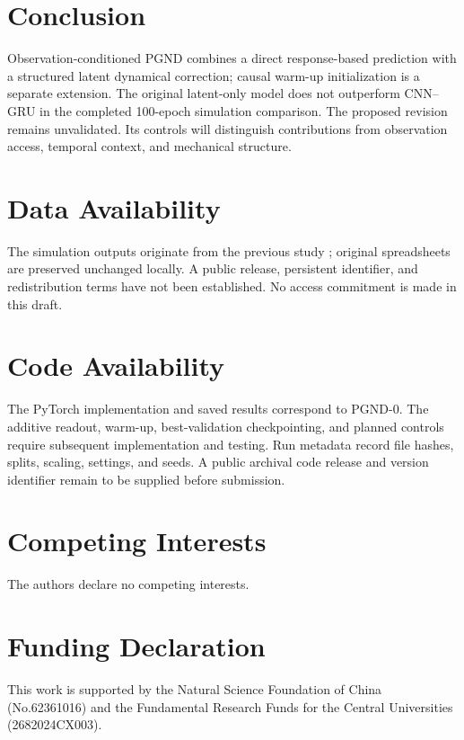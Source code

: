 \documentclass[journal,twoside]{IEEEtran}
\begin{document}
\section{Conclusion}
Observation-conditioned PGND combines a direct response-based prediction
with a structured latent dynamical correction; causal warm-up initialization
is a separate extension. The original latent-only model does not outperform
CNN--GRU in the completed 100-epoch simulation comparison. The proposed
revision remains unvalidated. Its controls will distinguish contributions
from observation access, temporal context, and mechanical structure.

\section{Data Availability}
The simulation outputs originate from the previous study
\cite{ale2026realtime}; original spreadsheets are preserved unchanged
locally. A public release, persistent identifier, and redistribution terms
have not been established. No access commitment is made in this draft.

\section{Code Availability}
The PyTorch implementation and saved results correspond to PGND-0.
The additive readout, warm-up, best-validation checkpointing, and planned
controls require subsequent implementation and testing. Run metadata record
file hashes, splits, scaling, settings, and seeds. A public archival code
release and version identifier remain to be supplied before submission.

\section*{Competing Interests}
The authors declare no competing interests.

\section*{Funding Declaration}
This work is supported by the Natural Science Foundation of China
(No.62361016) and the Fundamental Research Funds for the Central
Universities (2682024CX003).



\end{document}
